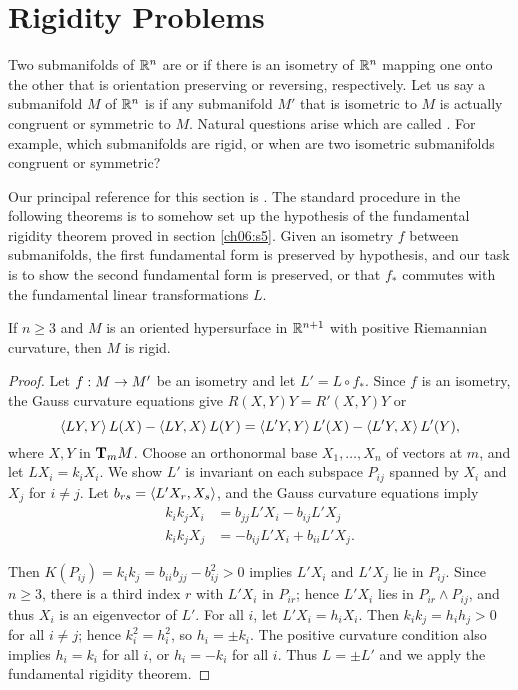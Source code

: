 \documentclass[../main]{subfiles}
\begin{document}
\section{Rigidity Problems}\label{ch08:s5}

Two submanifolds of $\bR^n$ are  or  if there is an isometry of $\bR^n$ mapping one onto the other that is orientation preserving or reversing, respectively. Let us say a submanifold $M$ of $\bR^n$ is  if any submanifold $M'$ that is isometric to $M$ is actually congruent or symmetric to $M$. Natural questions arise which are called . For example, which submanifolds are rigid, or when are two isometric submanifolds congruent or symmetric?

Our principal reference for this section is \cite{chern1951topics}. The standard procedure in the following theorems is to somehow set up the hypothesis of the fundamental rigidity theorem proved in section \ref{ch06:s5}. Given an isometry $f$ between submanifolds, the first fundamental form is preserved by hypothesis, and our task is to show the second fundamental form is preserved, or that $f_*$ commutes with the fundamental linear transformations $L$.


\begin{theorem} \label{thm:ch8.5.1}
If $n \geq 3$ and $M$ is an oriented hypersurface in $\bR^{n+1}$ with positive Riemannian curvature, then $M$ is rigid.
\end{theorem}

\begin{proof}
Let $f: M \functionMaps M'$ be an isometry and let $L'=L\circ f_*$. Since $f$ is an isometry, the Gauss curvature equations give $R(X,Y)Y=R'(X, Y) Y$ or \[\ip{LY}{Y}L(X)-\ip{LY}{X}L(Y)=\ip{L'Y}{Y}L'(X)-\ip{L'Y}{X}L'(Y),\] where $X, Y$ in $\ts{M}{m}$. Choose an orthonormal base $X_1, \dots, X_n$ of vectors at $m$, and let $L X_i=k_iX_i$. We show $L'$ is invariant on each subspace $P_{ij}$ spanned by $X_i$ and $X_j$ for $i \neq j$. Let $b_{r s}=\ip{L'X_r}{X_s}$, and the Gauss curvature equations imply
\begin{align*}
    k_i k_j X_i&=b_{j j} L' X_i-b_{i j} L' X_j\\
    k_i k_j X_j&=-b_{i j} L' X_i+b_{i i} L' X_j.
\end{align*}

Then $K(P_{i j})=k_ik_j=b_{ii} b_{jj}-b_{i j}^2>0$ implies $L' X_i$ and $L' X_j$ lie in $P_{i j}$. Since $n \geq 3$, there is a third index $r$ with $L'X_i$ in $P_{ir}$; hence $L' X_i$ lies in $P_{i r} \wedge P_{i j}$, and thus $X_i$ is an eigenvector of $L'$. For all $i$, let $L' X_i=h_i X_i$. Then $k_i k_j=h_i h_j>0$ for all $i \neq j$; hence $k_i^2=h_i^2$, so $h_i=\pm k_i$. The positive curvature condition also implies $h_i=k_i$ for all $i$, or $h_i=-k_i$ for all $i$. Thus $L=\pm L'$ and we apply the fundamental rigidity theorem.
\end{proof}
\end{document}
